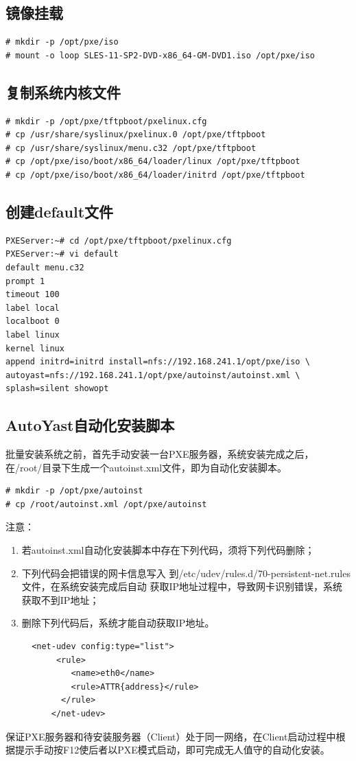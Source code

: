 \subsection{镜像挂载}

\begin{verbatim}
# mkdir -p /opt/pxe/iso
# mount -o loop SLES-11-SP2-DVD-x86_64-GM-DVD1.iso /opt/pxe/iso  
\end{verbatim}

\subsection{复制系统内核文件}

\begin{verbatim}
# mkdir -p /opt/pxe/tftpboot/pxelinux.cfg
# cp /usr/share/syslinux/pxelinux.0 /opt/pxe/tftpboot
# cp /usr/share/syslinux/menu.c32 /opt/pxe/tftpboot
# cp /opt/pxe/iso/boot/x86_64/loader/linux /opt/pxe/tftpboot
# cp /opt/pxe/iso/boot/x86_64/loader/initrd /opt/pxe/tftpboot
\end{verbatim}

\subsection{创建default文件}

\begin{verbatim}
PXEServer:~# cd /opt/pxe/tftpboot/pxelinux.cfg
PXEServer:~# vi default
default menu.c32
prompt 1
timeout 100
label local 
localboot 0   	
label linux
kernel linux
append initrd=initrd install=nfs://192.168.241.1/opt/pxe/iso \
autoyast=nfs://192.168.241.1/opt/pxe/autoinst/autoinst.xml \
splash=silent showopt  
\end{verbatim}

\subsection{AutoYast自动化安装脚本}

批量安装系统之前，首先手动安装一台PXE服务器，系统安装完成之后，
在/root/目录下生成一个autoinst.xml文件，即为自动化安装脚本。

\begin{verbatim}
# mkdir -p /opt/pxe/autoinst
# cp /root/autoinst.xml /opt/pxe/autoinst  
\end{verbatim}

注意：
\begin{enumerate}[itemsep=0pt,parsep=0pt]
\item 若autoinst.xml自动化安装脚本中存在下列代码，须将下列代码删除；
\item 下列代码会把错误的网卡信息写入
  到/etc/udev/rules.d/70-persistent-net.rules文件，在系统安装完成后自动
  获取IP地址过程中，导致网卡识别错误，系统获取不到IP地址；
\item 删除下列代码后，系统才能自动获取IP地址。
  \begin{verbatim}
  <net-udev config:type="list">
   	   <rule>
      	  <name>eth0</name>
       	  <rule>ATTR{address}</rule>
       	</rule>
  	  </net-udev>  
  \end{verbatim}
\end{enumerate}

保证PXE服务器和待安装服务器（Client）处于同一网络，在Client启动过程中根
据提示手动按F12使后者以PXE模式启动，即可完成无人值守的自动化安装。


